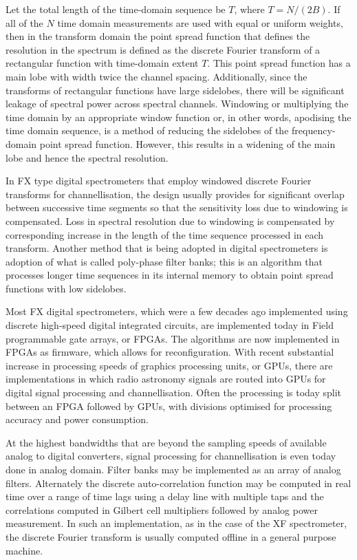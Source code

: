   Let the total length of the time-domain sequence be $T$, where $T = N/(2B)$.  If all of the $N$ time domain measurements are used with equal or uniform weights, then in the transform domain the point spread function that defines the resolution in the spectrum is defined as the discrete Fourier transform of a rectangular function with time-domain extent $T$.  This point spread function has a main lobe with width twice the channel spacing.  Additionally, since the transforms of rectangular functions have large sidelobes, there will be significant leakage of spectral power across spectral channels. Windowing or multiplying the time domain by an appropriate window function or, in other words, apodising the time domain sequence, is a method of reducing the sidelobes of the frequency-domain point spread function.  However, this results in a widening of the main lobe and hence the spectral resolution.  
  
  In FX type digital spectrometers that employ windowed discrete Fourier transforms for channellisation, the design usually provides for significant overlap between successive time segments so that the sensitivity loss due to windowing is compensated.  Loss in spectral resolution due to windowing is compensated by corresponding increase in the length of the time sequence processed in each transform.  Another method that is being adopted in digital spectrometers is adoption of what is called poly-phase filter banks; this is an algorithm that processes longer time sequences in its internal memory to obtain point spread functions with low sidelobes.
  
  Most FX digital spectrometers, which were a few decades ago implemented using discrete high-speed digital integrated circuits, are implemented today in Field programmable gate arrays, or FPGAs.  The algorithms are now implemented in FPGAs as firmware, which allows for reconfiguration.  With recent substantial increase in processing speeds of graphics processing units, or GPUs, there are implementations in which radio astronomy signals are routed into GPUs for digital signal processing and channellisation.  Often the processing is today split between an FPGA followed by GPUs, with divisions optimised for processing accuracy and power consumption.  
  
  At the highest bandwidths that are beyond the sampling speeds of available analog to digital converters, signal processing for channellisation is even today done in analog domain.  Filter banks may be implemented as an array of analog filters.  Alternately the discrete auto-correlation function may be computed in real time over a range of time lags using a delay line with multiple taps and the correlations computed in Gilbert cell multipliers followed by analog power measurement.  In such an implementation, as in the case of the XF spectrometer, the discrete Fourier transform is usually computed offline in a general purpose machine.

